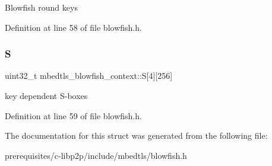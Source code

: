 Blowfish round keys 

Definition at line 58 of file blowfish.\+h.

\mbox{\label{structmbedtls__blowfish__context_ab366ec526d9d5303483ed9c5bbb6a049}} 
\subsubsection{\texorpdfstring{S}{S}}
{\footnotesize\ttfamily uint32\+\_\+t mbedtls\+\_\+blowfish\+\_\+context\+::S\mbox{[}4\mbox{]}\mbox{[}256\mbox{]}}

key dependent S-\/boxes 

Definition at line 59 of file blowfish.\+h.



The documentation for this struct was generated from the following file\+:\begin{DoxyCompactItemize}
\item 
prerequisites/c-\/libp2p/include/mbedtls/blowfish.\+h\end{DoxyCompactItemize}
